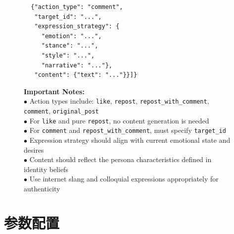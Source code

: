\documentclass[lettersize,journal]{IEEEtran}
\begin{document}
\begin{figure}[!t]
\begin{minipage}[t]{0.48\textwidth}
\begin{promptbox}
\begin{verbatim}
  {"action_type": "comment",
   "target_id": "...",
   "expression_strategy": {
     "emotion": "...",
     "stance": "...",
     "style": "...",
     "narrative": "..."},
   "content": {"text": "..."}}]}
\end{verbatim}
\vspace{4pt}
\textbf{Important Notes:}\\[2pt]
$\bullet$ Action types include: \texttt{like}, \texttt{repost}, \texttt{repost\_with\_comment}, \texttt{comment}, \texttt{original\_post}\\[2pt]
$\bullet$ For \texttt{like} and pure \texttt{repost}, no content generation is needed\\[2pt]
$\bullet$ For \texttt{comment} and \texttt{repost\_with\_comment}, must specify \texttt{target\_id}\\[2pt]
$\bullet$ Expression strategy should align with current emotional state and desires\\[2pt]
$\bullet$ Content should reflect the persona characteristics defined in identity beliefs\\[2pt]
$\bullet$ Use internet slang and colloquial expressions appropriately for authenticity
\end{promptbox}
\end{minipage}
\end{figure}
\section{参数配置}

\begin{table}[!t]
\centering
\caption{霍克斯点过程参数配置（三个事件统一）}
\label{tab:hawkes_params}
\renewcommand{\arraystretch}{1.0}
\end{table}
\end{document}
